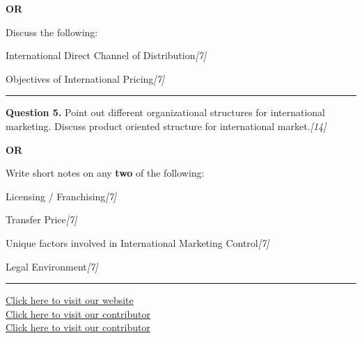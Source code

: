 \documentclass[11pt,a4paper]{article}
\newcommand{\pts}[1]{\hfill   \textit{[#1]}}
\begin{document}
\centerline{   \textbf{OR}}

Discuss the following:

\begin{parts}
  \item International Direct Channel of Distribution\pts{7}
  \item Objectives of International Pricing\pts{7}
\end{parts}

\medskip\rule{\linewidth}{0.2pt}




\noindent   \textbf{Question 5.}
Point out different organizational structures for international marketing. Discuss product oriented structure for international market.\pts{14}

\centerline{   \textbf{OR}}

Write short notes on any   \textbf{two} of the following:

\begin{parts}
  \item Licensing / Franchising\pts{7}
  \item Transfer Price\pts{7}
  \item Unique factors involved in International Marketing Control\pts{7}
  \item Legal Environment\pts{7}
\end{parts}

\vfill
\rule{\linewidth}{0.4pt}

\begin{center}\small
\href{https://bhu-exam.vercel.app/}{Click here to visit our website}\\[4pt]
\href{https://me-aryan.vercel.app/}{Click here to visit our contributor}\\[4pt]
\href{https://quashan-me.vercel.app/}{Click here to visit our contributor}
\end{center}
\end{document}
